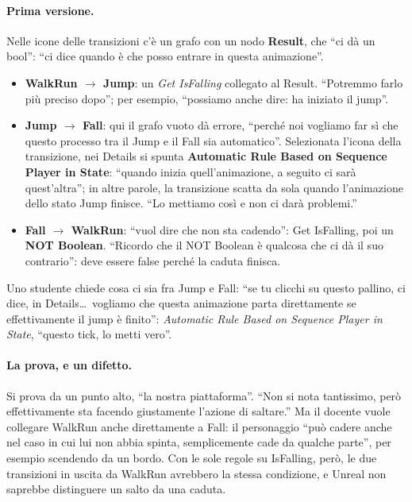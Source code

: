 \paragraph{Prima versione.} Nelle icone delle transizioni c'è un grafo con un nodo
\textbf{Result}, che ``ci dà un bool'': ``ci dice quando è che posso entrare in questa
animazione''.
\begin{itemize}
  \item \textbf{WalkRun $\rightarrow$ Jump}: un \emph{Get IsFalling} collegato al
        Result. ``Potremmo farlo più preciso dopo''; per esempio, ``possiamo anche dire:
        ha iniziato il jump''.
  \item \textbf{Jump $\rightarrow$ Fall}: qui il grafo vuoto dà errore, ``perché noi
        vogliamo far sì che questo processo tra il Jump e il Fall sia automatico''.
        Selezionata l'icona della transizione, nei Details si spunta \textbf{Automatic
        Rule Based on Sequence Player in State}: ``quando inizia quell'animazione, a
        seguito ci sarà quest'altra''; in altre parole, la transizione scatta da sola
        quando l'animazione dello stato Jump finisce. ``Lo mettiamo così e non ci darà
        problemi.''
  \item \textbf{Fall $\rightarrow$ WalkRun}: ``vuol dire che non sta cadendo'': Get
        IsFalling, poi un \textbf{NOT Boolean}. ``Ricordo che il NOT Boolean è qualcosa
        che ci dà il suo contrario'': deve essere false perché la caduta finisca.
\end{itemize}
Uno studente chiede cosa ci sia fra Jump e Fall: ``se tu clicchi su questo pallino, ci
dice, in Details\dots\ vogliamo che questa animazione parta direttamente se effettivamente
il jump è finito'': \emph{Automatic Rule Based on Sequence Player in State}, ``questo
tick, lo metti vero''.

\paragraph{La prova, e un difetto.} Si prova da un punto alto, ``la nostra piattaforma''.
``Non si nota tantissimo, però effettivamente sta facendo giustamente l'azione di
saltare.'' Ma il docente vuole collegare WalkRun anche direttamente a Fall: il
personaggio ``può cadere anche nel caso in cui lui non abbia spinta, semplicemente cade da
qualche parte'', per esempio scendendo da un bordo. Con le sole regole su IsFalling,
però, le due transizioni in uscita da WalkRun avrebbero la stessa condizione, e Unreal
non saprebbe distinguere un salto da una caduta.

